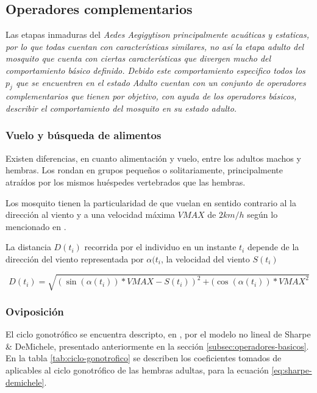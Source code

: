 
\subsection{Operadores complementarios}
Las etapas inmaduras del \em Aedes Aegigyti\em son principalmente acuáticas y estaticas, por lo que todas cuentan con
características similares, no así la etapa adulto del mosquito que cuenta con ciertas características que divergen
mucho del comportamiento básico definido. Debido este comportamiento especifico todos los $p_{j}$ que se encuentren en
el estado \em Adulto \em cuentan con un conjunto de operadores complementarios que tienen por objetivo, con ayuda de
los operadores básicos, describir el comportamiento del mosquito en su estado adulto.

\subsubsection{Vuelo y búsqueda de alimentos}
Existen diferencias, en cuanto alimentación y vuelo, entre los adultos machos y hembras. Los rondan en grupos pequeños
o solitariamente, principalmente atraídos por los mismos huéspedes vertebrados que las hembras.

Los mosquito tienen la particularidad de que vuelan en sentido contrario al la dirección al viento y a una velocidad máxima $VMAX$ de $2 km/h$ según lo mencionado en \cite{web-site:speedAnimals}.

La distancia $D(t_{i})$ recorrida por el individuo en un instante $t_{i}$  depende de la dirección del viento
representada por $\alpha(t_{i}$, la velocidad del viento $S(t_{i})$

\begin{equation}
 D (t_{i}) = \sqrt{{(\sin(\alpha(t_{i})) * VMAX  - S(t_{i}))}^{2}
  + {(\cos(\alpha(t_{i})) * VMAX} ^{2} }
\end{equation}

\subsubsection{Oviposición}
\label{subsec:cap4-oviposicion}
El ciclo gonotrófico se encuentra descripto, en \cite{otero2006stochastic}, por el modelo no lineal de Sharpe
\& DeMichele, presentado anteriormente en la sección \ref{subsec:operadores-basicos}. En la tabla
\ref{tab:ciclo-gonotrofico} se describen los coeficientes tomados de \cite{otero2006stochastic} aplicables al
ciclo gonotrófico de las hembras adultas, para la ecuación \eqref{eq:sharpe-demichele}.

